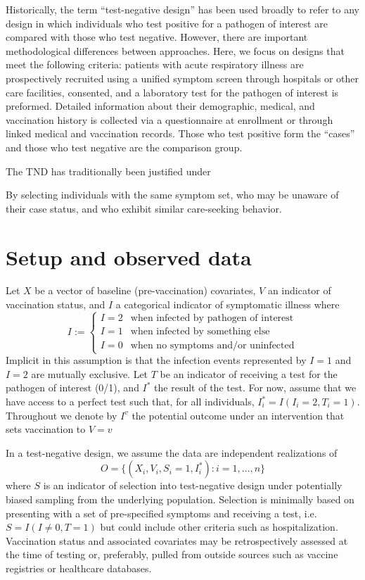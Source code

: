 \documentclass[11pt]{article}
\begin{document}
Historically, the term ``test-negative design'' has been used  broadly to refer to any design in which individuals who test positive for a pathogen of interest are compared with those who test negative. However, there are important methodological differences between approaches. Here, we focus on designs that meet the following criteria: patients with acute respiratory illness are prospectively recruited using a unified symptom screen through hospitals or other care facilities, consented, and a laboratory test for the pathogen of interest is preformed. Detailed information about their demographic, medical, and vaccination history is collected via a questionnaire at enrollment or through linked medical and vaccination records. Those who test positive form the ``cases'' and those who test negative are the comparison group. 

The TND has traditionally been justified under 

By selecting individuals with the same symptom set, who may be unaware of their case status, and who exhibit similar care-seeking behavior. 

\section{Setup and observed data} \label{sec:setup}
Let $X$ be a vector of baseline (pre-vaccination) covariates, $V$ an indicator of vaccination status, and $I$ a categorical indicator of symptomatic illness where
        $$I := \begin{cases} 
        I = 2 & \text{when infected by pathogen of interest} \\
        I = 1 & \text{when infected by something else } \\
        I = 0 & \text{when no symptoms and/or uninfected}
        \end{cases}$$
Implicit in this assumption is that the infection events represented by $I = 1$ and $I = 2$ are mutually exclusive. Let $T$ be an indicator of receiving a test for the pathogen of interest (0/1), and $I^*$ the result of the test. For now, assume that we have access to a perfect test such that, for all individuals, $I^*_i = I(I_i = 2, T_i = 1)$. Throughout we denote by $I^v$ the potential outcome under an intervention that sets vaccination to $V=v$
    
In a test-negative design, we assume the data are independent realizations of 
$$O = \{(X_i, V_i, S_i = 1, I^*_i) : i = 1, \ldots, n\}$$
where $S$ is an indicator of selection into test-negative design under potentially biased sampling from the underlying population. Selection is minimally based on presenting with a set of pre-specified symptoms and receiving a test, i.e. $S = I(I \neq 0, T = 1)$ but could include other criteria such as hospitalization. Vaccination status and associated covariates may be retrospectively assessed at the time of testing or, preferably, pulled from outside sources such as vaccine registries or healthcare databases. 
\end{document}
